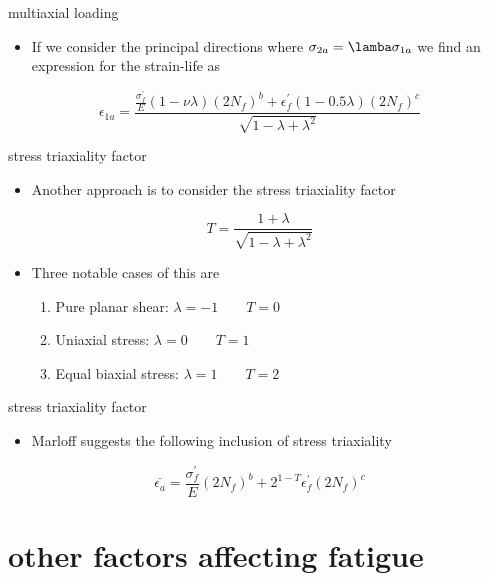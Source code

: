 \documentclass[
  letterpaper,
  ignorenonframetext,
  aspectratio=43,
  handout,
  12pt]{beamer}
\providecommand{\tightlist}{%
  \setlength{\itemsep}{0pt}\setlength{\parskip}{0pt}}
\providecommand{\tightlist}{%
\setlength{\itemsep}{0pt}\setlength{\parskip}{0pt}}
\begin{document}
\begin{frame}{multiaxial loading}
\protect\hypertarget{multiaxial-loading-2}{}
\begin{itemize}
\tightlist
\item
  If we consider the principal directions where
  \(\sigma_{2a}= \lamba \sigma_{1a}\) we find an expression for the
  strain-life as
\end{itemize}

\[\epsilon_{1a} = \frac{\frac{\sigma_f^\prime}{E}(1-\nu \lambda)(2N_f)^b + \epsilon_f^\prime(1-0.5\lambda)(2N_f)^c}{\sqrt{1-\lambda+\lambda^2}}\]
\end{frame}

\begin{frame}{stress triaxiality factor}
\protect\hypertarget{stress-triaxiality-factor}{}
\begin{itemize}
\tightlist
\item
  Another approach is to consider the stress triaxiality factor
\end{itemize}

\[T = \frac{1+\lambda}{\sqrt{1-\lambda+\lambda^2}}\]

\begin{itemize}
\tightlist
\item
  Three notable cases of this are

  \begin{enumerate}
  \tightlist
  \item
    Pure planar shear: \(\lambda = -1 \qquad T = 0\)
  \item
    Uniaxial stress: \(\lambda = 0 \qquad T = 1\)
  \item
    Equal biaxial stress: \(\lambda = 1 \qquad T = 2\)
  \end{enumerate}
\end{itemize}
\end{frame}

\begin{frame}{stress triaxiality factor}
\protect\hypertarget{stress-triaxiality-factor-1}{}
\begin{itemize}
\tightlist
\item
  Marloff suggests the following inclusion of stress triaxiality
\end{itemize}

\[\bar{\epsilon_a} = \frac{\sigma_f^\prime}{E}(2 N_f)^b + 2^{1-T}\epsilon_f^\prime(2N_f)^c\]
\end{frame}

\hypertarget{other-factors-affecting-fatigue}{%
\section{other factors affecting
fatigue}\label{other-factors-affecting-fatigue}}
\end{document}

